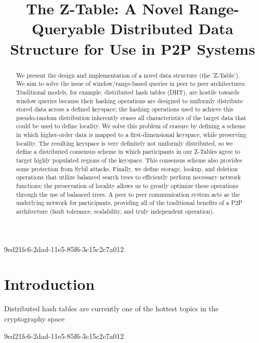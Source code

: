 \documentclass[12pt]{article}
\title{The Z-Table: A Novel Range-Queryable Distributed Data Structure for Use in P2P Systems}
\begin{document}
9ed21fc6-2dad-11e5-85f6-3c15c2c7a012\maketitle

\begin{abstract}
We present the design and implementation of a novel data structure (the 'Z-Table'). We aim to solve the issue of window/range-based queries in peer to peer architectures. Traditional models, for example,  distributed hash tables (DHT), are hostile towards window queries because their hashing operations are designed to uniformly distribute stored data across a defined keyspace; the hashing operations used to achieve this pseudo-random distribution inherently erases all characteristics of the target data that could be used to define locality. We solve this problem of erasure by defining a scheme in which higher-order data is mapped to a first-dimensional keyspace, while preserving locality. The resulting keyspace is very definitely not uniformly distributed, so we define a distributed consensus scheme in which participants in our Z-Tables agree to target highly populated regions of the keyspace. This consensus scheme also provides some protection from Sybil attacks. Finally, we define storage, lookup, and deletion operations that utilize balanced search trees to efficiently perform necessary network functions; the preservation of locality allows us to greatly optimize these operations through the use of balanced trees. A peer to peer communication system acts as the underlying network for participants, providing all of the traditional benefits of a P2P architecture (fault tolerance, scalability, and truly independent operation).
\end{abstract}


\newpage
\section{Introduction}
Distributed hash tables are currently one of the hottest topics in the cryptography space~\cite{Stoica:2001dj,Rowstron:2001ea,Ratnasamy:2001wn}

\printbibliography
9ed21fc6-2dad-11e5-85f6-3c15c2c7a012
\end{document}
